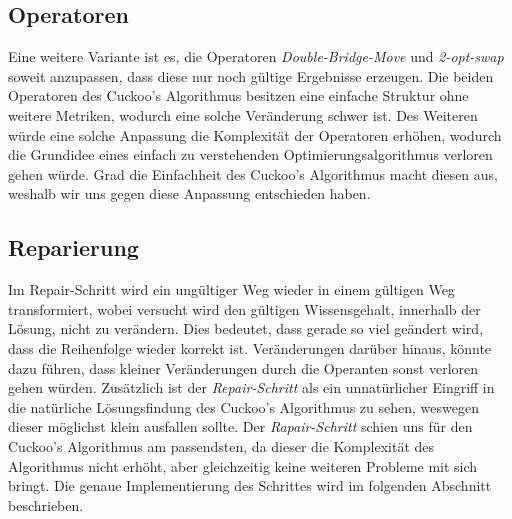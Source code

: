 \documentclass[conference]{IEEEtran}
\begin{document}
    \subsection{Operatoren} 
      Eine weitere Variante ist es, die Operatoren \textit{Double-Bridge-Move} und \textit{2-opt-swap} soweit anzupassen, dass diese
      nur noch gültige Ergebnisse erzeugen. Die beiden Operatoren des Cuckoo's Algorithmus besitzen eine einfache 
      Struktur ohne weitere Metriken, wodurch eine solche Veränderung schwer ist. 
      Des Weiteren würde eine solche Anpassung die Komplexität der Operatoren erhöhen, wodurch die Grundidee eines 
      einfach zu verstehenden Optimierungsalgorithmus verloren gehen würde. 
      Grad die Einfachheit des Cuckoo's Algorithmus macht diesen aus, weshalb wir uns gegen diese Anpassung entschieden haben.


    \subsection{Reparierung}
      Im Repair-Schritt wird ein ungültiger Weg wieder in einem gültigen Weg transformiert, wobei 
      versucht wird den gültigen Wissensgehalt, innerhalb der Lösung, nicht zu verändern. Dies bedeutet, 
      dass gerade so viel geändert wird, dass die Reihenfolge wieder korrekt ist. Veränderungen darüber hinaus, 
      könnte dazu führen, dass kleiner Veränderungen durch die Operanten sonst verloren gehen würden.
      Zusätzlich ist der \textit{Repair-Schritt} als ein unnatürlicher Eingriff in die natürliche Lösungsfindung des Cuckoo's Algorithmus zu sehen, 
      weswegen dieser möglichst klein ausfallen sollte.
      Der \textit{Rapair-Schritt} schien uns für den Cuckoo's Algorithmus am passendsten, da dieser die Komplexität des Algorithmus nicht erhöht, aber 
      gleichzeitig keine weiteren Probleme mit sich bringt. 
      Die genaue Implementierung des Schrittes wird im folgenden Abschnitt beschrieben.
\end{document}
